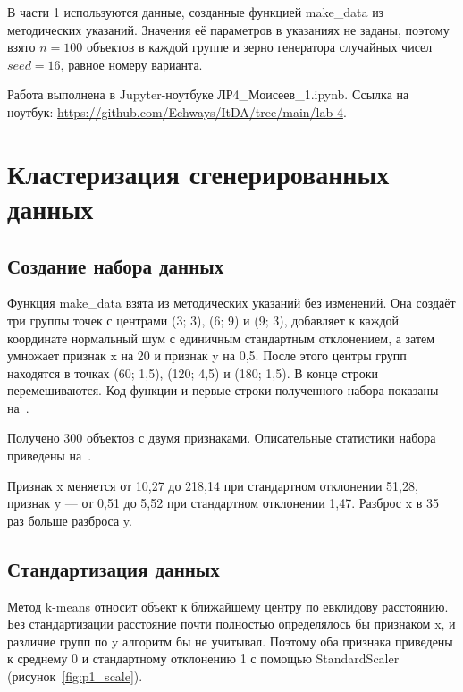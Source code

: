 \documentclass[a4paper,14pt]{extarticle}
\begin{document}
В части 1 используются данные, созданные функцией make\_data из методических указаний. Значения её параметров в указаниях не заданы, поэтому взято $n = 100$ объектов в каждой группе и зерно генератора случайных чисел $seed = 16$, равное номеру варианта.

Работа выполнена в Jupyter-ноутбуке ЛР4\_Моисеев\_1.ipynb. Ссылка на ноутбук: \url{https://github.com/Echways/ItDA/tree/main/lab-4}.

\section{Кластеризация сгенерированных данных}

\subsection{Создание набора данных}

Функция make\_data взята из методических указаний без изменений. Она создаёт три группы точек с центрами (3; 3), (6; 9) и (9; 3), добавляет к каждой координате нормальный шум с единичным стандартным отклонением, а затем умножает признак x на 20 и признак y на 0,5. После этого центры групп находятся в точках (60; 1,5), (120; 4,5) и (180; 1,5). В конце строки перемешиваются. Код функции и первые строки полученного набора показаны на~.


Получено 300 объектов с двумя признаками. Описательные статистики набора приведены на~.


Признак x меняется от 10,27 до 218,14 при стандартном отклонении 51,28, признак y — от 0,51 до 5,52 при стандартном отклонении 1,47. Разброс x в 35 раз больше разброса y.

\subsection{Стандартизация данных}

Метод k-means относит объект к ближайшему центру по евклидову расстоянию. Без стандартизации расстояние почти полностью определялось бы признаком x, и различие групп по y алгоритм бы не учитывал. Поэтому оба признака приведены к среднему 0 и стандартному отклонению 1 с помощью StandardScaler (рисунок~\ref{fig:p1_scale}).
\end{document}
